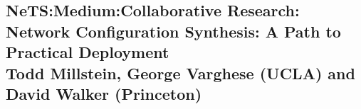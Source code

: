 \documentclass[11pt]{article}
\begin{document}

%

\newpage
{}
\setcounter{page}{1}

\begin{centering}
\section*{{\Large NeTS:Medium:Collaborative Research: \\ Network Configuration Synthesis: A Path to Practical Deployment} \\
   {\normalsize Todd Millstein, George Varghese (UCLA) and David Walker (Princeton)} }
\end{centering}

\makeatletter
\renewcommand{\paragraph}{%
  \@startsection{paragraph}{4}%
  {\z@}{0.5ex \@plus 0.5ex \@minus .2ex}{-1em}%
  {\normalfont\normalsize\bfseries}%
}
\makeatother



\newpage

\setcounter{page}{1}



\newpage
\end{document}
